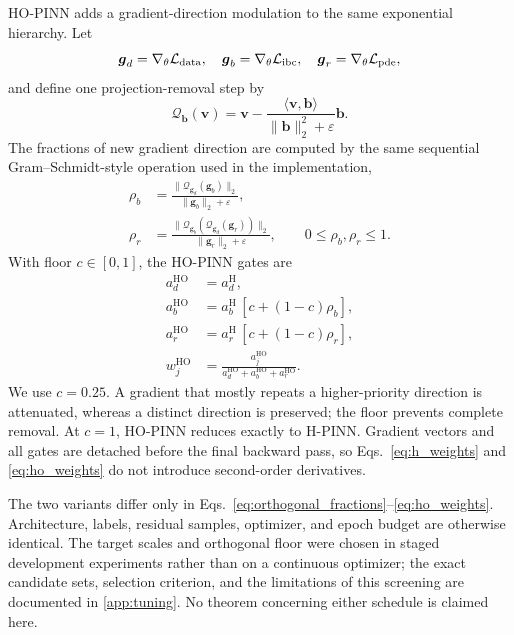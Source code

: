 HO-PINN adds a gradient-direction modulation to the same exponential hierarchy. Let
\begin{equation}
    \boldsymbol g_d=\nabla_\theta\mathcal{L}_{\mathrm{data}},
    \quad \boldsymbol g_b=\nabla_\theta\mathcal{L}_{\mathrm{ibc}},
    \quad \boldsymbol g_r=\nabla_\theta\mathcal{L}_{\mathrm{pde}},
\end{equation}
and define one projection-removal step by
\begin{equation}
    \mathcal Q_{\boldsymbol b}(\boldsymbol v)
    =\boldsymbol v-
    \frac{\langle\boldsymbol v,\boldsymbol b\rangle}
    {\lVert\boldsymbol b\rVert_2^2+\varepsilon}\boldsymbol b.
\end{equation}
The fractions of new gradient direction are computed by the same sequential Gram--Schmidt-style operation used in the implementation,
\begin{align}
    \rho_b&=\frac{\lVert\mathcal Q_{\boldsymbol g_d}(\boldsymbol g_b)\rVert_2}
    {\lVert\boldsymbol g_b\rVert_2+\varepsilon},\\
    \rho_r&=\frac{\lVert
    \mathcal Q_{\boldsymbol g_b}\!\left(
    \mathcal Q_{\boldsymbol g_d}(\boldsymbol g_r)\right)
    \rVert_2}{\lVert\boldsymbol g_r\rVert_2+\varepsilon},
    \qquad 0\le\rho_b,\rho_r\le1.
    \label{eq:orthogonal_fractions}
\end{align}
With floor \(c\in[0,1]\), the HO-PINN gates are
\begin{align}
    a_d^{\mathrm{HO}}&=a_d^{\mathrm H},\\
    a_b^{\mathrm{HO}}&=a_b^{\mathrm H}\,[c+(1-c)\rho_b],\\
    a_r^{\mathrm{HO}}&=a_r^{\mathrm H}\,[c+(1-c)\rho_r],
    \label{eq:ho_gates}\\
    w_j^{\mathrm{HO}}&=\frac{a_j^{\mathrm{HO}}}
    {a_d^{\mathrm{HO}}+a_b^{\mathrm{HO}}+a_r^{\mathrm{HO}}}.
    \label{eq:ho_weights}
\end{align}
We use \(c=0.25\). A gradient that mostly repeats a higher-priority direction is attenuated, whereas a distinct direction is preserved; the floor prevents complete removal. At \(c=1\), HO-PINN reduces exactly to H-PINN. Gradient vectors and all gates are detached before the final backward pass, so Eqs.~\eqref{eq:h_weights} and \eqref{eq:ho_weights} do not introduce second-order derivatives.

The two variants differ only in Eqs.~\eqref{eq:orthogonal_fractions}--\eqref{eq:ho_weights}. Architecture, labels, residual samples, optimizer, and epoch budget are otherwise identical. The target scales and orthogonal floor were chosen in staged development experiments rather than on a continuous optimizer; the exact candidate sets, selection criterion, and the limitations of this screening are documented in \ref{app:tuning}. No theorem concerning either schedule is claimed here.


